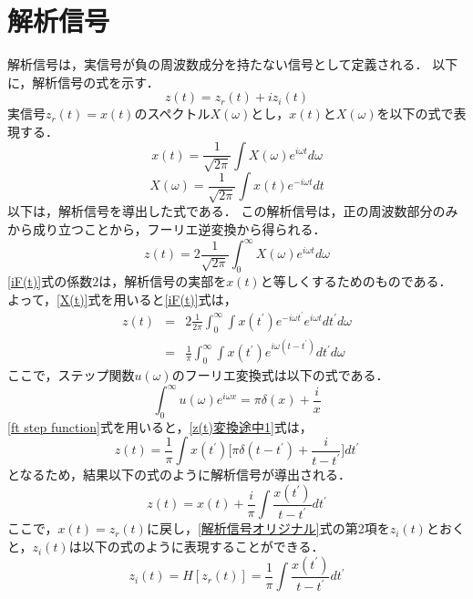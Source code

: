 \section{解析信号}
%
解析信号は，実信号が負の周波数成分を持たない信号として定義される．
以下に，解析信号の式を示す．%
\begin{equation}
    \label{analyse signal}
    z(t) = z_{r}(t) + iz_{i}(t)
\end{equation}
実信号$z_{r}(t) = x(t)$のスペクトル$X(\omega)$とし，$x(t)$と$X(\omega)$を以下の式で表現する．
%
\begin{equation}
    \label{x(t)}
    x(t) = \frac{1}{\sqrt{2\pi}} \int X(\omega) e^{i \omega t} d\omega
\end{equation}
%
\begin{equation}
    \label{X(t)}
    X(\omega) = \frac{1}{\sqrt{2\pi}} \int x(t) e^{-i\omega t} dt
\end{equation}
%
以下は，解析信号を導出した式である．
この解析信号は，正の周波数部分のみから成り立つことから，フーリエ逆変換から得られる．
\begin{equation}
    \label{iF(t)}
    z(t) = 2 \frac{1}{\sqrt{2\pi}} \int_{0}^{\infty} X(\omega) e^{i\omega t} d\omega
\end{equation}
%
\ref{iF(t)}式の係数$2$は，解析信号の実部を$x(t)$と等しくするためのものである．
よって，\ref{X(t)}式を用いると\ref{iF(t)}式は，
%
\begin{eqnarray}
    z(t) &=& 2 \frac{1}{2\pi} \int_{0}^{\infty} \int x(t^{\prime}) e^{-i\omega t^{\prime}} e^{i\omega t} dt^{\prime} d\omega \\
         &=& \frac{1}{\pi} \int_{0}^{\infty} \int x(t^{\prime}) e^{i\omega (t - t^{\prime})} dt^{\prime} d\omega \label{z(t)変換途中1}
\end{eqnarray}
%
ここで，ステップ関数$u(\omega)$のフーリエ変換式は以下の式である．
\begin{equation}
    \label{ft step function}
    \int_{0}^{\infty} u(\omega) e^{i \omega x} = \pi \delta (x) + \frac{i}{x}
\end{equation}
%
\ref{ft step function}式を用いると，\ref{z(t)変換途中1}式は，
\begin{equation}
    z(t) = \frac{1}{\pi} \int x(t^{\prime}) \biggl[ \pi \delta (t - t^{\prime}) + \frac{i}{t - t^{\prime}} \biggr] dt^{\prime}
\end{equation}
%
となるため，結果以下の式のように解析信号が導出される．
\begin{equation}
    \label{解析信号オリジナル}
    z(t) = x(t) + \frac{i}{\pi} \int \frac{x(t^{\prime})}{t - t^{\prime}} dt^{\prime}
\end{equation}
%
ここで，$x(t) = z_{r}(t)$に戻し，\ref{解析信号オリジナル}式の第2項を$z_{i}(t)$とおくと，$z_{i}(t)$は以下の式のように表現することができる．
\begin{equation}
    \label{ヒルベルト変換}
    z_{i}(t) = H[z_{r}(t)] = \frac{1}{\pi} \int \frac{x(t^{\prime})}{t - t^{\prime}} dt^{\prime}
\end{equation}
%

